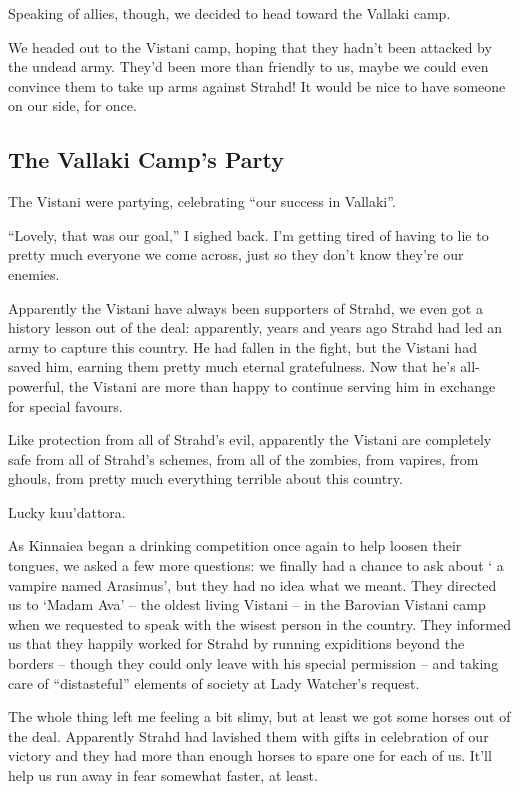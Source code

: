 Speaking of allies, though, we decided to head toward the Vallaki camp.

We headed out to the Vistani camp, hoping that they hadn't been attacked by the undead army. They'd been more than friendly to us, maybe we could even convince them to take up arms against Strahd! It would be nice to have someone on our side, for once.

\subsection*{The Vallaki Camp's Party}
The Vistani were partying, celebrating ``our success in Vallaki''.

``Lovely, that was our goal,'' I sighed back. I'm getting tired of having to lie to pretty much everyone we come across, just so they don't know they're our enemies.

Apparently the Vistani have always been supporters of Strahd, we even got a history lesson out of the deal: apparently, years and years ago Strahd had led an army to capture this country. He had fallen in the fight, but the Vistani had saved him, earning them pretty much eternal gratefulness. Now that he's all-powerful, the Vistani are more than happy to continue serving him in exchange for special favours.

Like protection from all of Strahd's evil, apparently the Vistani are completely safe from all of Strahd's schemes, from all of the zombies, from vapires, from ghouls, from pretty much everything terrible about this country.

Lucky kuu'dattora.

As Kinnaiea began a drinking competition once again to help loosen their tongues, we asked a few more questions: we finally had a chance to ask about ` a vampire named Arasimus', but they had no idea what we meant. They directed us to `Madam Ava' -- the oldest living Vistani -- in the Barovian Vistani camp when we requested to speak with the wisest person in the country. They informed us that they happily worked for Strahd by running expiditions beyond the borders -- though they could only leave with his special permission -- and taking care of ``distasteful'' elements of society at Lady Watcher's request.

The whole thing left me feeling a bit slimy, but at least we got some horses out of the deal. Apparently Strahd had lavished them with gifts in celebration of our victory and they had more than enough horses to spare one for each of us. It'll help us run away in fear somewhat faster, at least.

